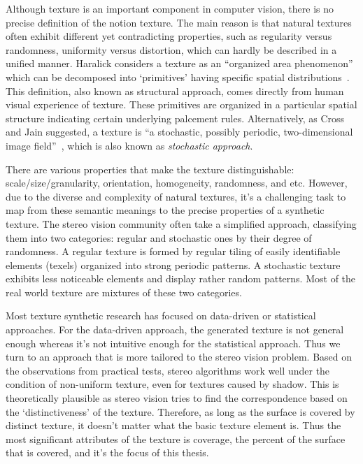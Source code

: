 Although texture is an important component in computer vision, there is no precise definition of the notion texture. The main reason is that natural textures often exhibit different yet contradicting properties, such as regularity versus randomness, uniformity versus distortion, which can hardly be described in a unified manner. Haralick considers a texture as an ``organized area phenomenon'' which can be decomposed into `primitives' having specific spatial distributions~\cite{haralick1979statistical}. This definition, also known as structural approach, comes directly from human visual experience of texture. These primitives are organized in a particular spatial structure indicating certain underlying palcement rules. Alternatively, as Cross and Jain suggested, a texture is ``a stochastic, possibly periodic, two-dimensional image field''~\cite{cross1983markov}, which is also known as \textit{stochastic approach}.


There are various properties that make the texture distinguishable: scale/size/granularity, orientation, homogeneity, randomness, and etc. However, due to the diverse and complexity of natural textures, it's a challenging task to map from these semantic meanings to the precise properties of a synthetic texture. The stereo vision community often take a simplified approach, classifying them into two categories: regular and stochastic ones by their degree of randomness. A regular texture is formed by regular tiling of easily identifiable elements (texels) organized into strong periodic patterns. A stochastic texture exhibits less noticeable elements and display rather random patterns. Most of the real world texture are mixtures of these two categories.

Most texture synthetic research has focused on data-driven or statistical approaches. For the data-driven approach, the generated texture is not general enough whereas it's not intuitive enough for the statistical approach. Thus we turn to an approach that is more tailored to the stereo vision problem. Based on the observations from practical tests, stereo algorithms work well under the condition of non-uniform texture, even for textures caused by shadow. This is theoretically plausible as stereo vision tries to find the correspondence based on the `distinctiveness' of the texture. Therefore, as long as the surface is covered by distinct texture, it doesn't matter what the basic texture element is. Thus the most significant attributes of the texture is coverage, \ie the percent of the surface that is covered, and it's the focus of this thesis.

